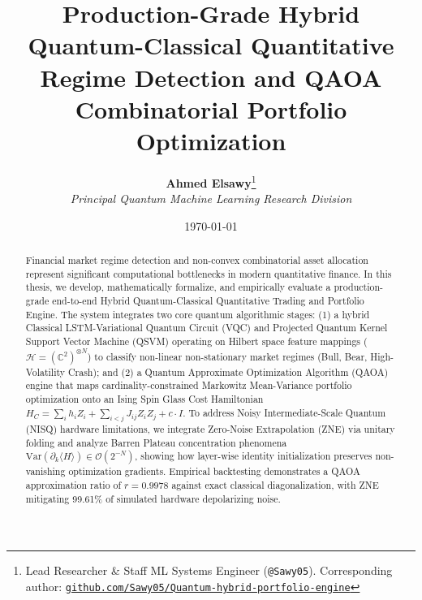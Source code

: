 \documentclass[11pt,a4paper,twocolumn]{article}
\title{\textbf{Production-Grade Hybrid Quantum-Classical Quantitative Regime Detection and QAOA Combinatorial Portfolio Optimization}}
\author{
    \textbf{Ahmed Elsawy}\thanks{Lead Researcher \& Staff ML Systems Engineer (\texttt{@Sawy05}). Corresponding author: \href{https://github.com/Sawy05/Quantum-hybrid-portfolio-engine}{\texttt{github.com/Sawy05/Quantum-hybrid-portfolio-engine}}} \\
    \textit{Principal Quantum Machine Learning Research Division}
}
\date{\today}
\begin{document}
\maketitle

\begin{abstract}
Financial market regime detection and non-convex combinatorial asset allocation represent significant computational bottlenecks in modern quantitative finance. In this thesis, we develop, mathematically formalize, and empirically evaluate a production-grade end-to-end Hybrid Quantum-Classical Quantitative Trading and Portfolio Engine. The system integrates two core quantum algorithmic stages: (1) a hybrid Classical LSTM-Variational Quantum Circuit (VQC) and Projected Quantum Kernel Support Vector Machine (QSVM) operating on Hilbert space feature mappings ($\mathcal{H} = (\mathbb{C}^2)^{\otimes N}$) to classify non-linear non-stationary market regimes (Bull, Bear, High-Volatility Crash); and (2) a Quantum Approximate Optimization Algorithm (QAOA) engine that maps cardinality-constrained Markowitz Mean-Variance portfolio optimization onto an Ising Spin Glass Cost Hamiltonian $H_C = \sum_i h_i Z_i + \sum_{i<j} J_{ij} Z_i Z_j + c \cdot I$. To address Noisy Intermediate-Scale Quantum (NISQ) hardware limitations, we integrate Zero-Noise Extrapolation (ZNE) via unitary folding and analyze Barren Plateau concentration phenomena $\mathrm{Var}(\partial_k \langle H \rangle) \in \mathcal{O}(2^{-N})$, showing how layer-wise identity initialization preserves non-vanishing optimization gradients. Empirical backtesting demonstrates a QAOA approximation ratio of $r=0.9978$ against exact classical diagonalization, with ZNE mitigating 99.61\% of simulated hardware depolarizing noise.
\end{abstract}












\end{document}
